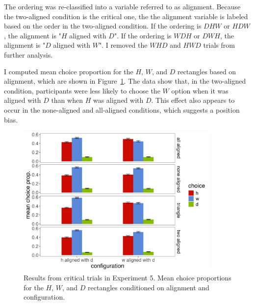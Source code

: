 The ordering was re-classified into a variable referred to as alignment. Because the two-aligned condition is the critical one, the the alignment variable is labeled based on the order in the two-aligned condition. If the ordering is $DHW$ or $HDW$, the alignment is "$H$ aligned with $D$". If the ordering is $WDH$ or $DWH$, the alignment is "$D$ aligned with $W$". I removed the $WHD$ and $HWD$ trials from further analysis.

I computed mean choice proportion for the $H$, $W$, and $D$ rectangles based on alignment, which are shown in Figure~\ref{fig:comparability_crit_mean_choices}. The data show that, in the two-aligned condition, participants were less likely to choose the $W$ option when it was aligned with $D$ than when $H$ was aligned with $D$. This effect also appears to occur in the none-aligned and all-aligned conditions, which suggests a position bias. 

\begin{figure}
   \includegraphics[width=100mm]{figures/comparability_crit_mean_hdw_choice_by_config_align.jpeg}
   \caption{Results from critical trials in Experiment 5. Mean choice proportions for the $H$, $W$, and $D$ rectangles conditioned on alignment and configuration.}
   \label{fig:comparability_crit_mean_choices}
\end{figure}


